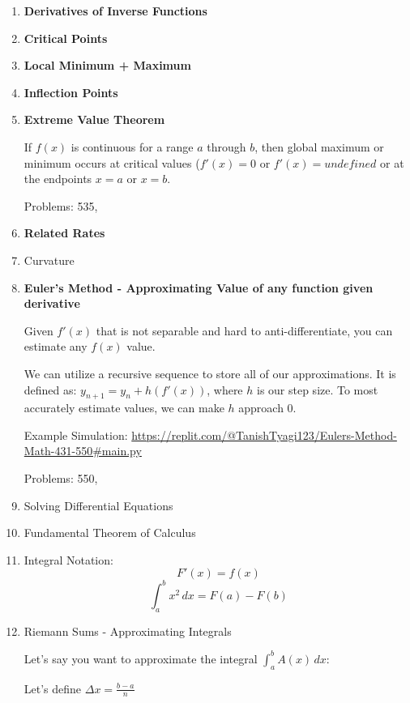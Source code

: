 \documentclass{article}
\begin{document}
\begin{enumerate}

\item \textbf{Derivatives of Inverse Functions}

\item \textbf{Critical Points}

\item \textbf{Local Minimum + Maximum}

\item \textbf{Inflection Points}

\item \textbf{Extreme Value Theorem}

If $f(x)$ is continuous for a range $a$ through $b$, then global maximum or minimum occurs at critical values ($f'(x) = 0$ or $f'(x) = undefined$ or at the endpoints $x = a$ or $x = b$.

Problems: 535, 

\item \textbf{Related Rates}

\item Curvature 

\item \textbf{Euler's Method - Approximating Value of any function given derivative}

Given $f'(x)$ that is not separable and hard to anti-differentiate, you can estimate any $f(x)$ value. 

We can utilize a recursive sequence to store all of our approximations. It is defined as: $y_{n+1} = y_{n} + h(f'(x))$, where $h$ is our step size. To most accurately estimate values, we can make $h$ approach 0.

Example Simulation: \url{https://replit.com/@TanishTyagi123/Eulers-Method-Math-431-550#main.py}

Problems: 550, 

\item Solving Differential Equations 

\item Fundamental Theorem of Calculus 

\item Integral Notation: 
$$ F'(x) = f(x) $$
$$ \int_{a}^{b} x^2 \,dx = F(a) - F(b) $$

\item Riemann Sums - Approximating Integrals

Let's say you want to approximate the integral $\int_{a}^{b} A(x) \,dx$: 

Let's define $\Delta x = \frac{b - a}{n}$


\end{enumerate}
\end{document}
